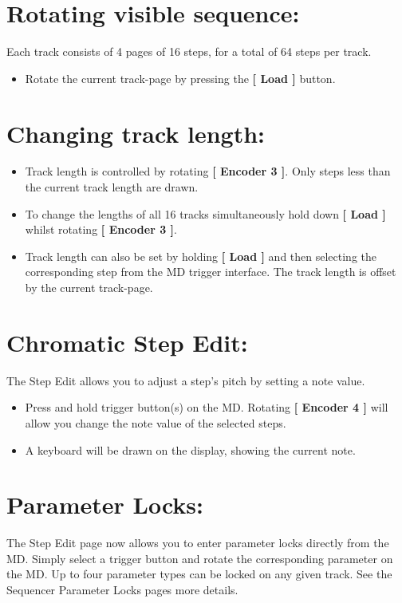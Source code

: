 \vspace{-0.3cm}

\section{Rotating visible sequence:}
Each track consists of 4 pages of 16 steps, for a total of 64 steps per track.
\begin{itemize}
\item Rotate the current track-page by pressing the \textbf{[ Load ] }button.
\end{itemize}

\vspace{-0.3cm}

\section{Changing track length:}
\begin{itemize}
\item Track length is controlled by rotating \textbf{[ Encoder 3 ]}. Only steps less than the current track length are drawn.
\item To change the lengths of all 16 tracks simultaneously hold down \textbf{[ Load ]} whilst rotating \textbf{[ Encoder 3 ]}.
\item Track length can also be set by holding \textbf{[ Load ]} and then selecting the corresponding step from the MD trigger interface. The track length is offset by the current track-page.
\end{itemize}

\section{Chromatic Step Edit:}
The Step Edit allows you to adjust a step's pitch by setting a note value. 
\begin{itemize}
\item Press and hold trigger button(s) on the MD. Rotating \textbf{[ Encoder 4 ]} will allow you change the note value of the selected steps.
\item A keyboard will be drawn on the display, showing the current note.
\end{itemize}

\section{Parameter Locks:}
The Step Edit page now allows you to enter parameter locks directly from the MD. Simply select a trigger button and rotate the corresponding parameter on the MD. Up to four parameter types can be locked on any given track. See the Sequencer Parameter Locks pages more details.

